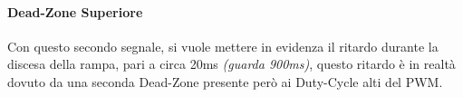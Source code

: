 \begin{enumerate}
	      \paragraph{Dead-Zone Superiore} Con questo secondo segnale, si vuole mettere in evidenza il ritardo durante la discesa della rampa, pari a circa 20ms {\small \textit{(guarda 900ms)}}, questo ritardo è in realtà dovuto da una seconda Dead-Zone presente però ai Duty-Cycle alti del PWM.
\end{enumerate}
